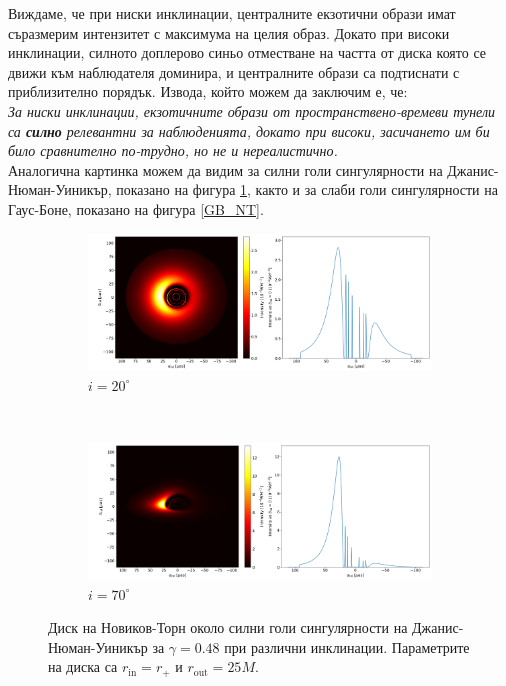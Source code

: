Виждаме, че при ниски инклинации, централните екзотични образи имат съразмерим интензитет с максимума на целия образ. Докато при високи инклинации, силното доплерово синьо отместване на частта от диска която се движи към наблюдателя доминира, и централните образи са подтиснати с приблизително порядък. Извода, който можем да заключим е, че:\\

\emph{За ниски инклинации, екзотичните образи от пространствено-времеви тунели са \textbf{силно} релевантни за наблюденията, докато при високи, засичането им би било сравнително по-трудно, но не и нереалистично.} \\

Аналогична картинка можем да видим за силни голи сингулярности на Джанис-Нюман-Уиникър, показано на фигура \ref{JNW_NT}, както и за слаби голи сингулярности на Гаус-Боне, показано на фигура \ref{GB_NT}.

\begin{figure}[!htb]
	\centering
	\begin{subfigure}{12cm}
		\hspace{-0.6cm}
		\includegraphics[scale = 0.26]{JNW_NT_Gamma0.48_20_deg.png}
		\caption{$i = 20^\circ$} 
	\end{subfigure}\\
	\begin{subfigure}{12cm}
		\hspace{-0.6cm}
		\includegraphics[scale = 0.26]{JNW_NT_Gamma0.48_70_deg.png}
		\caption{$i = 70^\circ$} 
	\end{subfigure}
	\caption[Диск на Новиков-Торн около силни голи сингулярности на Джанис-Нюман-Уиникър при различни инклинации.]{\small Диск на Новиков-Торн около силни голи сингулярности на Джанис-Нюман-Уиникър за $\gamma = 0.48$ при различни инклинации. Параметрите на диска са $r_\text{in} = r_\text{+}$ и $r_\text{out} = 25M$.} 
	\label{JNW_NT}
\end{figure}

